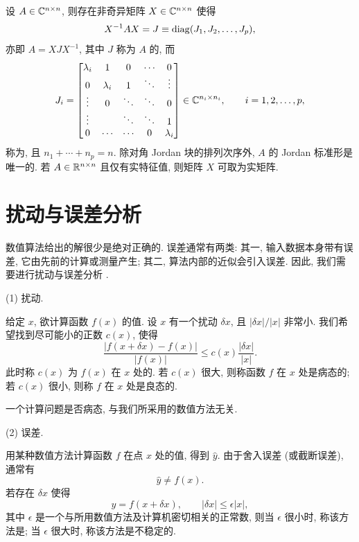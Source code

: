 \begin{theorem}
\label{thm:ch1-jordan}
设 $A\in\mathbb{C}^{n\times n}$, 则存在非奇异矩阵 $X\in\mathbb{C}^{n\times n}$ 使得
\[
  X^{-1}AX=J\equiv\operatorname{diag}(J_1,J_2,\ldots,J_p),
\]
亦即 $A=XJX^{-1}$, 其中 $J$ 称为 $A$ 的, 而
\[
  J_i=\begin{bmatrix}
    \lambda_i & 1         & 0      & \cdots & 0      \\
    0         & \lambda_i & 1      & \ddots & \vdots \\
    \vdots    & 0         & \ddots & \ddots & 0      \\
    \vdots    &           & \ddots & \ddots & 1      \\
    0         & \cdots    & \cdots & 0      & \lambda_i
  \end{bmatrix}\in\mathbb{C}^{n_i\times n_i},\qquad i=1,2,\ldots,p,
\]
称为, 且 $n_1+\cdots+n_p=n$. 除对角 Jordan 块的排列次序外, $A$ 的 Jordan 标准形是唯一的. 若 $A\in\mathbb{R}^{n\times n}$ 且仅有实特征值, 则矩阵 $X$ 可取为实矩阵.
\end{theorem}

\section{扰动与误差分析}
\label{sec:ch1-perturbation}

数值算法给出的解很少是绝对正确的. 误差通常有两类: 其一, 输入数据本身带有误差, 它由先前的计算或测量产生; 其二, 算法内部的近似会引入误差. 因此, 我们需要进行扰动与误差分析 \cite{src:12,src:69,src:96}.

\medskip
\noindent (1) 扰动.

给定 $x$, 欲计算函数 $f(x)$ 的值. 设 $x$ 有一个扰动 $\delta x$, 且 $|\delta x|/|x|$ 非常小. 我们希望找到尽可能小的正数 $c(x)$, 使得
\[
  \frac{|f(x+\delta x)-f(x)|}{|f(x)|}\leqslant c(x)\frac{|\delta x|}{|x|}.
\]
此时称 $c(x)$ 为 $f(x)$ 在 $x$ 处的. 若 $c(x)$ 很大, 则称函数 $f$ 在 $x$ 处是病态的; 若 $c(x)$ 很小, 则称 $f$ 在 $x$ 处是良态的.

\begin{mremark}
一个计算问题是否病态, 与我们所采用的数值方法无关.
\end{mremark}

\medskip
\noindent (2) 误差.

用某种数值方法计算函数 $f$ 在点 $x$ 处的值, 得到 $\hat{y}$. 由于舍入误差 (或截断误差), 通常有
\[
  \hat{y}\neq f(x).
\]
若存在 $\delta x$ 使得
\[
  \hat{y}=f(x+\delta x),\qquad |\delta x|\leqslant\epsilon|x|,
\]
其中 $\epsilon$ 是一个与所用数值方法及计算机密切相关的正常数, 则当 $\epsilon$ 很小时, 称该方法是; 当 $\epsilon$ 很大时, 称该方法是不稳定的.

